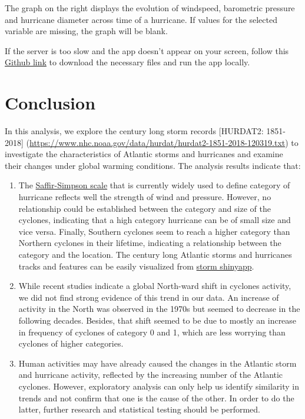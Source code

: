 \documentclass[]{book}
\begin{document}
The graph on the right displays the evolution of windspeed, barometric pressure and hurricane diameter across time of a hurricane. If values for the selected variable are missing, the graph will be blank.

If the server is too slow and the app doesn't appear on your screen, follow this \href{https://github.com/jqz300/edav_proj}{Github link} to download the necessary files and run the app locally.

\hypertarget{conclusion}{%
\chapter{Conclusion}\label{conclusion}}

In this analysis, we explore the century long storm records {[}HURDAT2: 1851-2018{]} (\url{https://www.nhc.noaa.gov/data/hurdat/hurdat2-1851-2018-120319.txt}) to investigate the characteristics of Atlantic storms and hurricanes and examine their changes under global warming conditions. The analysis results indicate that:

\begin{enumerate}
\def\labelenumi{(\arabic{enumi})}
\item
  The \href{https://www.nhc.noaa.gov/aboutsshws.php}{Saffir-Simpson scale} that is currently widely used to define category of hurricane reflects well the strength of wind and pressure. However, no relationship could be established between the category and size of the cyclones, indicating that a high category hurricane can be of small size and vice versa. Finally, Southern cyclones seem to reach a higher category than Northern cyclones in their lifetime, indicating a relationship between the category and the location. The century long Atlantic storms and hurricanes tracks and features can be easily visualized from \href{https://hurricane.shinyapps.io/01_01/}{storm shinyapp}.
\item
  While recent studies indicate a global North-ward shift in cyclones activity, we did not find strong evidence of this trend in our data. An increase of activity in the North was observed in the 1970s but seemed to decrease in the following decades. Besides, that shift seemed to be due to mostly an increase in frequency of cyclones of category 0 and 1, which are less worrying than cyclones of higher categories.
\item
  Human activities may have already caused the changes in the Atlantic storm and hurricane activity, reflected by the increasing number of the Atlantic cyclones. However, exploratory analysis can only help us identify similarity in trends and not confirm that one is the cause of the other. In order to do the latter, further research and statistical testing should be performed.
\end{enumerate}


\end{document}
